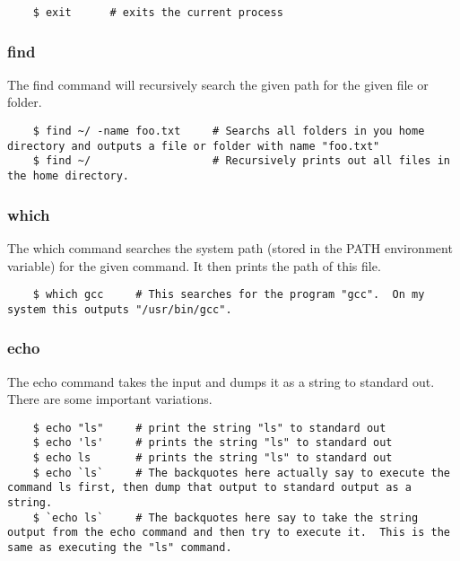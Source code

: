 	\begin{verbatim}
	$ exit		# exits the current process
	\end{verbatim}


\subsubsection{find} \mdseries
The find command will recursively search the given path for the given file or folder.

	\begin{verbatim}
	$ find ~/ -name foo.txt		# Searchs all folders in you home directory and outputs a file or folder with name "foo.txt"
	$ find ~/					# Recursively prints out all files in the home directory.
	\end{verbatim}


\subsubsection{which} \mdseries
The which command searches the system path (stored in the PATH environment variable) for the given command.  It then prints the path of this file.

	\begin{verbatim}
	$ which gcc		# This searches for the program "gcc".  On my system this outputs "/usr/bin/gcc".  
	\end{verbatim}

\subsubsection{echo} \mdseries
The echo command takes the input and dumps it as a string to standard out.  There are some important variations.

	\begin{verbatim}
	$ echo "ls"		# print the string "ls" to standard out
	$ echo 'ls'		# prints the string "ls" to standard out
	$ echo ls		# prints the string "ls" to standard out
	$ echo `ls`		# The backquotes here actually say to execute the command ls first, then dump that output to standard output as a string.
	$ `echo ls`		# The backquotes here say to take the string output from the echo command and then try to execute it.  This is the same as executing the "ls" command.
	\end{verbatim}

